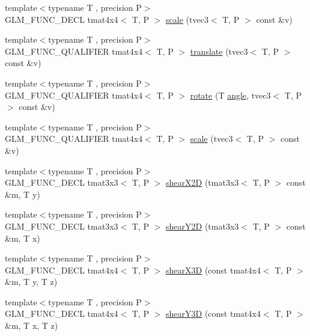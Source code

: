 \begin{DoxyCompactItemize}
\item 
{\footnotesize template$<$typename T , precision P$>$ }\\G\+L\+M\+\_\+\+F\+U\+N\+C\+\_\+\+D\+E\+C\+L tmat4x4$<$ T, P $>$ \hyperlink{group__gtx__transform_ga1972d4a66a2e92637c8aaee598417a71}{scale} (tvec3$<$ T, P $>$ const \&v)
\item 
{\footnotesize template$<$typename T , precision P$>$ }\\G\+L\+M\+\_\+\+F\+U\+N\+C\+\_\+\+Q\+U\+A\+L\+I\+F\+I\+E\+R tmat4x4$<$ T, P $>$ \hyperlink{group__gtx__transform_ga838c4505ef7f254ed05117b1ac9691fb}{translate} (tvec3$<$ T, P $>$ const \&v)
\item 
{\footnotesize template$<$typename T , precision P$>$ }\\G\+L\+M\+\_\+\+F\+U\+N\+C\+\_\+\+Q\+U\+A\+L\+I\+F\+I\+E\+R tmat4x4$<$ T, P $>$ \hyperlink{group__gtx__transform_ga2020c91bf61e050882b3a5c18eada700}{rotate} (T \hyperlink{group__gtc__quaternion_gad4a4448baedb198b2b1e7880d2544dc9}{angle}, tvec3$<$ T, P $>$ const \&v)
\item 
{\footnotesize template$<$typename T , precision P$>$ }\\G\+L\+M\+\_\+\+F\+U\+N\+C\+\_\+\+Q\+U\+A\+L\+I\+F\+I\+E\+R tmat4x4$<$ T, P $>$ \hyperlink{group__gtx__transform_ga1972d4a66a2e92637c8aaee598417a71}{scale} (tvec3$<$ T, P $>$ const \&v)
\item 
{\footnotesize template$<$typename T , precision P$>$ }\\G\+L\+M\+\_\+\+F\+U\+N\+C\+\_\+\+D\+E\+C\+L tmat3x3$<$ T, P $>$ \hyperlink{group__gtx__transform2_ga10f6c62d8f827c4cacedb71fd05e4ba2}{shear\+X2\+D} (tmat3x3$<$ T, P $>$ const \&m, T y)
\item 
{\footnotesize template$<$typename T , precision P$>$ }\\G\+L\+M\+\_\+\+F\+U\+N\+C\+\_\+\+D\+E\+C\+L tmat3x3$<$ T, P $>$ \hyperlink{group__gtx__transform2_ga21ade82859e09a5cdaf4a01fbf8dc61b}{shear\+Y2\+D} (tmat3x3$<$ T, P $>$ const \&m, T x)
\item 
{\footnotesize template$<$typename T , precision P$>$ }\\G\+L\+M\+\_\+\+F\+U\+N\+C\+\_\+\+D\+E\+C\+L tmat4x4$<$ T, P $>$ \hyperlink{group__gtx__transform2_gae06ce274e4754f925d5d68440e89452e}{shear\+X3\+D} (const tmat4x4$<$ T, P $>$ \&m, T y, T z)
\item 
{\footnotesize template$<$typename T , precision P$>$ }\\G\+L\+M\+\_\+\+F\+U\+N\+C\+\_\+\+D\+E\+C\+L tmat4x4$<$ T, P $>$ \hyperlink{group__gtx__transform2_ga31253ea18fdcdfde08c134c8b67688f7}{shear\+Y3\+D} (const tmat4x4$<$ T, P $>$ \&m, T x, T z)

\end{DoxyCompactItemize}

